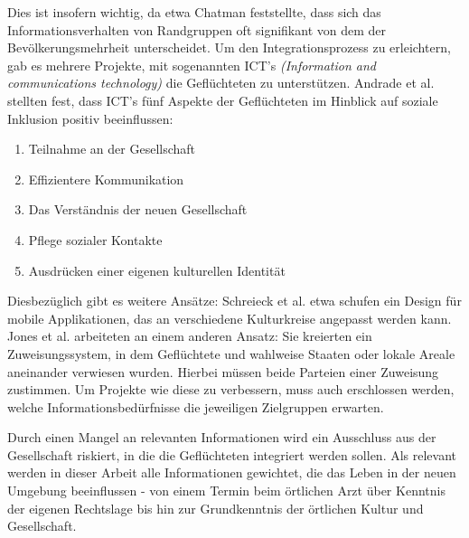 Dies ist insofern wichtig, da etwa Chatman feststellte, dass sich das Informationsverhalten von Randgruppen oft signifikant von dem der Bev\"olkerungsmehrheit unterscheidet. \citep{chatman1996impoverished}\newline \newline 
Um den Integrationsprozess zu erleichtern, gab es mehrere Projekte, mit sogenannten ICT's \textit{(Information and communications technology)} die Geflüchteten zu unterstützen. Andrade et al. stellten fest, dass ICT's  f\"unf Aspekte der Gefl\"uchteten im Hinblick auf soziale Inklusion positiv beeinflussen:
\begin{enumerate}
    \item   Teilnahme an der Gesellschaft
    \item   Effizientere Kommunikation
    \item   Das Verst\"andnis der neuen Gesellschaft
    \item   Pflege sozialer Kontakte
    \item   Ausdr\"ucken einer eigenen kulturellen Identit\"at
\end{enumerate}
Diesbez\"uglich gibt es weitere Ans\"atze:\newline
Schreieck et al. etwa schufen ein Design f\"ur mobile Applikationen, das an verschiedene Kulturkreise angepasst werden kann. \citep{schreieck2017supporting}\newline
Jones et al. arbeiteten an einem anderen Ansatz: Sie kreierten ein Zuweisungssystem, in dem Gefl\"uchtete und wahlweise Staaten oder lokale Areale aneinander verwiesen wurden. Hierbei m\"ussen beide Parteien einer Zuweisung zustimmen. \citep{jones2017matching}\newline
Um Projekte wie diese zu verbessern, muss auch erschlossen werden, welche Informationsbed\"urfnisse die jeweiligen Zielgruppen erwarten.\newline

Durch einen Mangel an relevanten Informationen wird ein Ausschluss aus der Gesellschaft riskiert, in die die Gefl\"uchteten integriert werden sollen. \citep{andrade2016information}\newline
Als relevant werden in dieser Arbeit alle Informationen gewichtet, die das Leben in der neuen Umgebung beeinflussen - von einem Termin beim \"ortlichen Arzt \"uber Kenntnis der eigenen Rechtslage bis hin zur Grundkenntnis der \"ortlichen Kultur und Gesellschaft. \citep{schreieck2017supporting}\newline